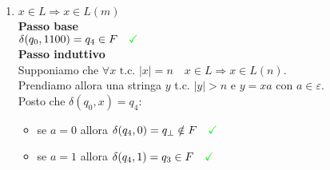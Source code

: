 \documentclass[a4paper,oneside]{scrbook}
\newcommand{\greenmark}{\quad \textcolor{green}{\checkmark}}
\begin{document}
\begin{enumerate}
	\item $x\in L \Rightarrow x \in L(m)$\\
	\textbf{Passo base}\\
	$ \delta(q_0,1100)=q_4 \in F \greenmark $\\
	\textbf{Passo induttivo}\\
	Supponiamo che $\forall x \text{ t.c. } |x|=n \quad x \in L \Rightarrow x\in L(n)$.\\
	Prendiamo allora una stringa $y$ t.c. $|y|>n$ e $y=xa \text{ con }a\in\varepsilon$.\\
	Posto che $\delta(q_0,x)=q_4$:
	\begin{itemize}
		\item se $a=0$ allora $\delta(q_4,0)=q_\bot \notin F \greenmark$
		\item se $a=1$ allora $\delta(q_4,1)=q_3 \in F \greenmark$
	\end{itemize}
	

\end{enumerate}
\end{document}
